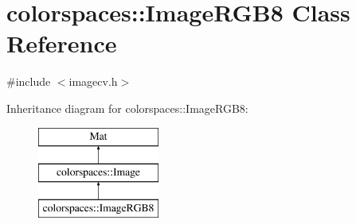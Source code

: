 \hypertarget{classcolorspaces_1_1_image_r_g_b8}{}\section{colorspaces\+:\+:Image\+R\+G\+B8 Class Reference}
\label{classcolorspaces_1_1_image_r_g_b8}


{\ttfamily \#include $<$imagecv.\+h$>$}

Inheritance diagram for colorspaces\+:\+:Image\+R\+G\+B8\+:\begin{figure}[H]
\begin{center}
\leavevmode
\includegraphics[height=3.000000cm]{classcolorspaces_1_1_image_r_g_b8}
\end{center}
\end{figure}
